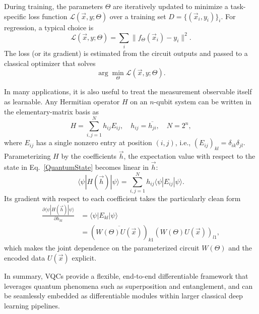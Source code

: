 During training, the parameters $\Theta$ are iteratively updated to minimize a task-specific loss function $\mathcal{L}(\overrightarrow{x}, y; \Theta)$ over a training set $D=\{(\overrightarrow{x}_i, y_i)\}_i$. For regression, a typical choice is
\begin{equation}
\mathcal{L}(\overrightarrow{x}, y; \Theta) = \sum_i \| f_{\Theta}(\overrightarrow{x}_i) - y_i \|^2.
\end{equation}
The loss (or its gradient) is estimated from the circuit outputs and passed to a classical optimizer that solves
\begin{equation}
\arg\min_{\Theta}\mathcal{L}(\overrightarrow{x},y; \Theta).
\end{equation}

In many applications, it is also useful to treat the measurement observable itself as learnable. Any Hermitian operator $H$ on an $n$-qubit system can be written in the elementary-matrix basis as
\begin{equation}
    H = \sum_{i,j=1}^{N} h_{ij}E_{ij}, \quad h_{ij}=\overline{h_{ji}}, \quad N=2^n,
\end{equation}
where $E_{ij}$ has a single nonzero entry at position $(i,j)$, i.e., $(E_{ij})_{kl}=\delta_{ik}\delta_{jl}$. Parameterizing $H$ by the coefficients $\overrightarrow{h}$, the expectation value with respect to the state in Eq.~\eqref{QuantumState} becomes linear in $\overrightarrow{h}$:
\begin{equation}
    \langle\psi|H(\overrightarrow{h})|\psi\rangle = \sum_{i,j=1}^{N}h_{ij}\langle\psi|E_{ij}|\psi\rangle.
\end{equation}
Its gradient with respect to each coefficient takes the particularly clean form
\begin{align}
    \frac{\partial \langle\psi|H(\overrightarrow{h})|\psi\rangle}{\partial h_{kl}} &= \langle\psi|E_{kl}|\psi\rangle \nonumber \\
    &= \left(\overline{W(\Theta)U(\overrightarrow{x})}\right)_{k1}\left(W(\Theta)U(\overrightarrow{x})\right)_{l1},
\end{align}
which makes the joint dependence on the parameterized circuit $W(\Theta)$ and the encoded data $U(\overrightarrow{x})$ explicit.

In summary, VQCs provide a flexible, end-to-end differentiable framework that leverages quantum phenomena such as superposition and entanglement, and can be seamlessly embedded as differentiable modules within larger classical deep learning pipelines.
